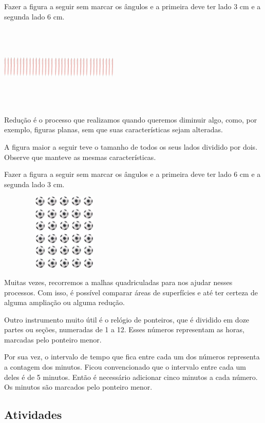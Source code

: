 \begin{enumerate}
\begin{escolha}
\begin{enumerate}
\begin{itemize}
\begin{itemize}
\begin{escolha}
Fazer a figura a seguir sem marcar os ângulos e a primeira deve ter lado
3 cm e a segunda lado 6 cm.

\includegraphics[width=2.21154in,height=1.55185in]{media/image56.png}

Redução é o processo que realizamos quando queremos diminuir algo,
como, por exemplo, figuras planas, sem que suas características
sejam alteradas.

A figura maior a seguir teve o tamanho de todos os seus lados dividido por dois. Observe que manteve as
mesmas características.

Fazer a figura a seguir sem marcar os ângulos e a primeira deve ter lado
6 cm e a segunda lado 3 cm.

\includegraphics[width=2.44231in,height=1.44820in]{media/image57.png}

Muitas vezes, recorremos a malhas quadriculadas para nos
ajudar nesses processos. Com isso, é possível comparar áreas de
superfícies e até ter certeza de alguma ampliação ou alguma redução.

Outro instrumento muito útil é o relógio de ponteiros, que é dividido em doze partes ou
seções, numeradas de 1 a 12. Esses números representam as horas, marcadas pelo ponteiro menor.

Por sua vez, o intervalo de tempo que fica entre cada um dos números
representa a contagem dos minutos. Ficou convencionado que o
intervalo entre cada um deles é de 5 minutos. Então é necessário adicionar cinco minutos a cada número. Os minutos são marcados pelo ponteiro menor.

\subsection{Atividades}\label{atividades-4}


\end{escolha}
\end{itemize}
\end{itemize}
\end{enumerate}
\end{escolha}
\end{enumerate}
